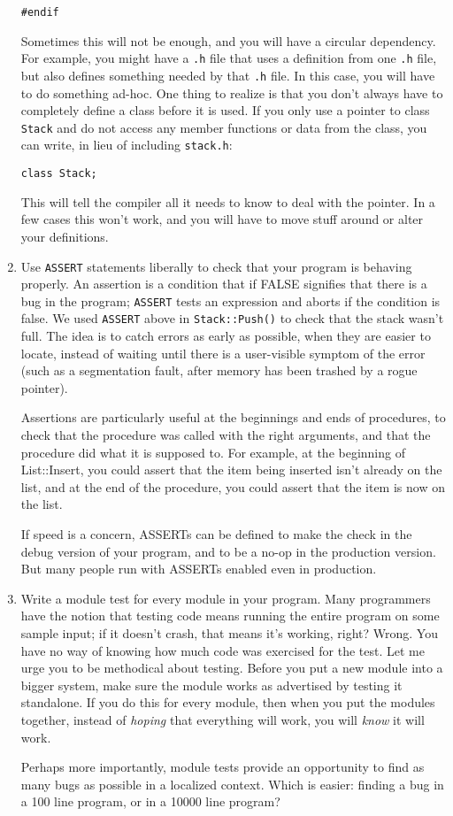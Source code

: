 \begin{enumerate}
\begin{verbatim}
#endif
\end{verbatim}
Sometimes this will not be enough, and you will have a circular
dependency.  For example, you might have a {\tt .h} file that
uses a definition from one {\tt .h} file, but also defines something
needed by that {\tt .h} file.  In this case, you will have to do 
something ad-hoc.  One thing to realize is that you don't always
have to completely define a class before it is used.  If you
only use a pointer to class {\tt Stack} and do not access any
member functions or data from the class, you can write, in lieu of 
including {\tt stack.h}:
\begin{verbatim}
class Stack;
\end{verbatim}
This will tell the compiler all it
needs to know to deal with the pointer.  In a few cases this won't work,
and you will have to move stuff around or alter your definitions.

\item Use {\tt ASSERT} statements liberally to check that your program
is behaving properly.  An assertion is a condition that if
FALSE signifies that there is a bug in the program;
{\tt ASSERT} tests an expression and aborts if the condition is
false.  We used {\tt ASSERT} above in {\tt Stack::Push()} to check 
that the stack wasn't full. The idea is to catch errors as early
as possible, when they are easier to locate, instead of waiting until 
there is a user-visible symptom of the error (such as a segmentation 
fault, after memory has been trashed by a rogue pointer).

Assertions are particularly useful at the beginnings and ends of 
procedures, to check that the procedure was called with the right 
arguments, and that the procedure did what it is supposed to.
For example, at the beginning of List::Insert, you could assert that 
the item being inserted isn't already on the list, and at the end of
the procedure, you could assert that the item is now on the list.

If speed is a concern, ASSERTs can be defined to make the check
in the debug version of your program, and to be a no-op in the production
version.  But many people run with ASSERTs enabled even in production.

\item Write a module test for every module in your program.
Many programmers have the notion that testing code means running
the entire program on some sample input; if it doesn't crash, that 
means it's working, right?  Wrong.  You have no way of knowing
how much code was exercised for the test.  Let me urge you to
be methodical about testing.  Before you put a new module
into a bigger system, make sure the module works as advertised 
by testing it standalone.  If you do this for every module, 
then when you put the modules together, instead of {\em hoping}
that everything will work, you will {\em know} it will work.

Perhaps more importantly, module tests provide an opportunity
to find as many bugs as possible in a localized context.  
Which is easier: finding a bug in a 100 line program, or in a 
10000 line program?

\end{enumerate}


